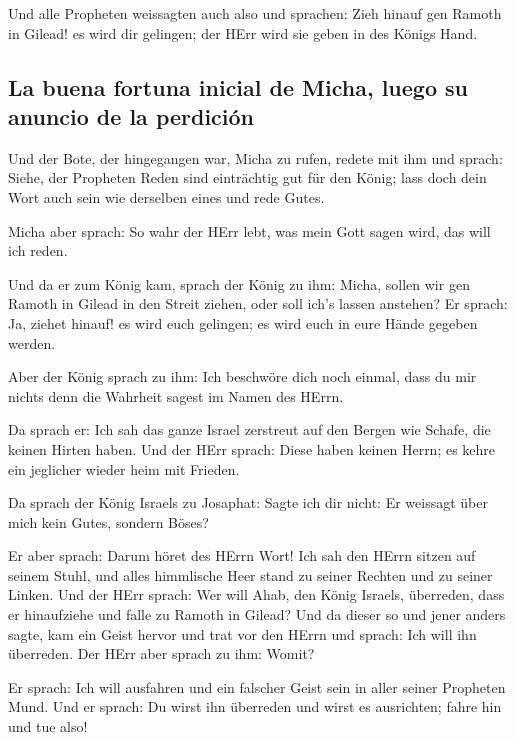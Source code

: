  Und alle Propheten weissagten auch also und sprachen:
Zieh hinauf gen Ramoth in Gilead! es wird dir gelingen; der HErr wird
sie geben in des Königs Hand.

\hypertarget{la-buena-fortuna-inicial-de-micha-luego-su-anuncio-de-la-perdiciuxf3n}{%
\subsection{La buena fortuna inicial de Micha, luego su anuncio de la
perdición}\label{la-buena-fortuna-inicial-de-micha-luego-su-anuncio-de-la-perdiciuxf3n}}

 Und der Bote, der hingegangen war, Micha zu rufen,
redete mit ihm und sprach: Siehe, der Propheten Reden sind einträchtig
gut für den König; lass doch dein Wort auch sein wie derselben eines und
rede Gutes.

 Micha aber sprach: So wahr der HErr lebt, was mein Gott
sagen wird, das will ich reden.

 Und da er zum König kam, sprach der König zu ihm: Micha,
sollen wir gen Ramoth in Gilead in den Streit ziehen, oder soll ich's
lassen anstehen? Er sprach: Ja, ziehet hinauf! es wird euch gelingen; es
wird euch in eure Hände gegeben werden.

 Aber der König sprach zu ihm: Ich beschwöre dich noch
einmal, dass du mir nichts denn die Wahrheit sagest im Namen des HErrn.

 Da sprach er: Ich sah das ganze Israel zerstreut auf den
Bergen wie Schafe, die keinen Hirten haben. Und der HErr sprach: Diese
haben keinen Herrn; es kehre ein jeglicher wieder heim mit Frieden.

 Da sprach der König Israels zu Josaphat: Sagte ich dir
nicht: Er weissagt über mich kein Gutes, sondern Böses?

 Er aber sprach: Darum höret des HErrn Wort! Ich sah den
HErrn sitzen auf seinem Stuhl, und alles himmlische Heer stand zu seiner
Rechten und zu seiner Linken.  Und der HErr sprach: Wer
will Ahab, den König Israels, überreden, dass er hinaufziehe und falle
zu Ramoth in Gilead? Und da dieser so und jener anders sagte,
 kam ein Geist hervor und trat vor den HErrn und sprach:
Ich will ihn überreden. Der HErr aber sprach zu ihm: Womit?

 Er sprach: Ich will ausfahren und ein falscher Geist
sein in aller seiner Propheten Mund. Und er sprach: Du wirst ihn
überreden und wirst es ausrichten; fahre hin und tue also!

